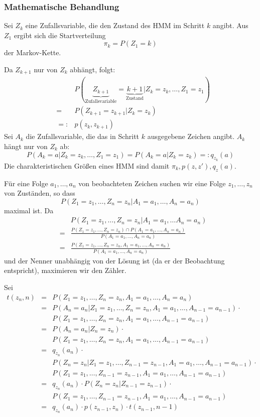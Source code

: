 \subsubsection{Mathematische Behandlung}
Sei \(Z_k\) eine Zufallsvariable, die den Zustand des HMM im Schritt \(k\) angibt.
Aus \(Z_1\) ergibt sich die Startverteilung \[\pi_k=P(Z_1=k)\] der Markov-Kette.

Da \(Z_{k+1}\) nur von \(Z_k\) abhängt, folgt:
\begin{eqnarray*}
	&&P(\underbrace{Z_{k+1}}_{\text{Zufallsvariable}}=\underbrace{k+1}_{\text{Zustand}}|Z_k=z_k,\dots,Z_1=z_1)\\
	&=& P(Z_{k+1}=z_{k+1}|Z_k=z_k)\\
	&=:& p(z_k,z_{k+1})
\end{eqnarray*}
Sei \(A_k\) die Zufallsvariable, die das in Schritt \(k\) ausgegebene Zeichen angibt.
\(A_k\) hängt nur von \(Z_k\) ab:
\[P(A_k=a|Z_k=z_k,\dots,Z_1=z_1) = P(A_k=a|Z_k=z_k) =: q_{z_k}(a)\]
Die charakteristischen Größen eines HMM sind damit \(\pi_k, p(z,z'), q_z(a)\).

Für eine Folge \(a_1,\dots,a_n\) von beobachteten Zeichen suchen wir eine Folge \(z_1,\dots,z_n\) von Zuständen, so dass
\[P(Z_1=z_1,\dots,Z_n=z_n|A_1=a_1,\dots,A_n=a_n)\]
maximal ist.
Da
\begin{eqnarray*}
	&&P(Z_1=z_1, \dots, Z_n=z_n | A_1=a_1, \dots A_n=a_n)\\
	&=& \frac{P(Z_1=z_1, \dots, Z_n=z_n) \cap P(A_1 = a_1, \dots, A_n=a_n)}{P(A_1=a_1, \dots, A_n=a_n)} \\
	&=& \frac{P(Z_1=z_1, \dots, Z_n=z_n, A_1 = a_1, \dots, A_n=a_n)}{P(A_1=a_1, \dots, A_n=a_n)}
\end{eqnarray*}
und der Nenner unabhängig von der Lösung ist (da er der Beobachtung entspricht), maximieren wir den Zähler.

Sei
\begin{eqnarray*}
	t(z_n,n) &=& P(Z_1=z_1, \dots, Z_n=z_n, A_1=a_1, \dots, A_n=a_n)\\
		&=& P(A_n=a_n|Z_1=z_1, \dots, Z_n=z_n, A_1=a_1, \dots, A_{n-1} = a_{n-1}) \cdot \\
		&& P(Z_1=z_1, \dots, Z_n=z_n, A_1=a_1, \dots, A_{n-1}=a_{n-1})\\
		&=& P(A_n=a_n|Z_n=z_n) \cdot \\
		&& P(Z_1=z_1, \dots, Z_n=z_n, A_1=a_1, \dots, A_{n-1}=a_{n-1})\\
		&=& q_{z_n}(a_n) \cdot\\
		&& P(Z_n=z_n|Z_1=z_1, \dots, Z_{n-1}=z_{n-1}, A_1=a_1, \dots, A_{n-1}=a_{n-1}) \cdot\\
		&& P(Z_1=z_1,\dots, Z_{n-1}=z_{n-1}, A_1=a_1, \dots, A_{n-1}=a_{n-1})\\
		&=& q_{z_n}(a_n) \cdot P(Z_n=z_n|Z_{n-1}=z_{n-1}) \cdot \\
		&& P(Z_1=z_1, \dots, Z_{n-1}=z_{n-1}, A_1=a_1, \dots, A_{n-1}=a_{n-1})\\
		&=& q_{z_n}(a_n) \cdot p(z_{n-1},z_n) \cdot t(z_{n-1},n-1)
\end{eqnarray*}



